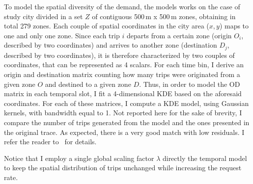 To model the spatial diversity of the demand, the models works on the case of study city divided in a set $Z$ of contiguous 500\,m x 500\,m zones, obtaining in total 279 zones. Each couple of spatial coordinates in the city area  ($x,y$) maps to one and only one zone.  Since each trip $i$ departs from a certain zone (origin $O_i$, described by two coordinates) and arrives to another zone (destination $D_j$, described by two coordinates), it is therefore characterized by two couples of coordinates, that can be represented as 4 scalars. 
For each time bin, I derive an origin and destination matrix counting how many trips were originated from a given zone $O$ and destined to a given zone $D$. Thus, in order to model the OD matrix in each temporal slot, I fit a 4-dimensional KDE based on the aforesaid coordinates.
For each of these matrices, I compute a KDE model, using Gaussian kernels, with bandwidth equal to 1. 
Not reported here for the sake of brevity, I compare the  number of trips generated from the model and the ones presented in the original trace. As expected, there is a very good match with low residuals. I refer the reader to~\cite{ciociola2020} for details.

Notice that I employ a single global scaling factor $\lambda$ directly the temporal model to keep the spatial distribution of trips unchanged while increasing the request rate. 